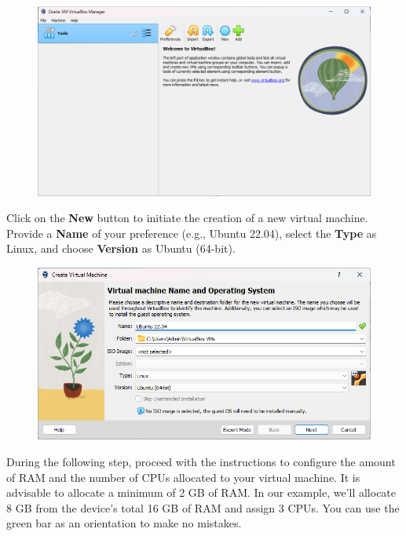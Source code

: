 \documentclass{article}
\begin{document}
\begin{figure}[H]
    \centering
    \includegraphics[width=\textwidth]{img/2./virtual_box1_english.png}
\end{figure}

\noindent
Click on the \textbf{New} button to initiate the creation of a new virtual machine. Provide a \textbf{Name} of your preference (e.g., Ubuntu 22.04), select the \textbf{Type} as Linux, and choose \textbf{Version} as Ubuntu (64-bit).

\begin{figure}[H]
    \centering
    \includegraphics[width=\textwidth]{img/2./virtual_box2_english.png}
\end{figure}

\noindent
During the following step, proceed with the instructions to configure the amount of RAM and the number of CPUs allocated to your virtual machine. It is advisable to allocate a minimum of 2 GB of RAM. In our example, we'll allocate 8 GB from the device's total 16 GB of RAM and assign 3 CPUs. You can use the green bar as an orientation to make no mistakes.
        
\end{document}
